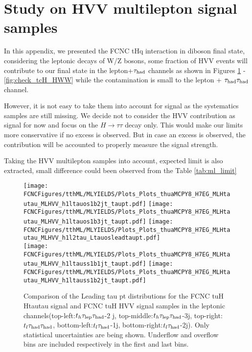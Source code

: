 \section{Study on HVV multilepton signal samples}
\label{sec:HVVML}

In this appendix, we presented the FCNC tHq interaction in diboson final state, considering the leptonic decays of W/Z bosons, some fraction of HVV events will contribute to our final state in the lepton+$\tau_\text{had}$ channels as shown in Figures \ref{fig:check_tuH_HWW} - \ref{fig:check_tcH_HWW} while the contamination is
small to the lepton + $\tau_\text{had}{}\tau_\text{had}$ channel.

However, it is not easy to take them into account for signal as the systematics samples are still missing. We decide not to consider the HVV contribution as signal for now
and focus on the $H\rightarrow \tau\tau$ decay only. This would make our limits more conservative if no excess is observed. But in case an excess is observed, the contribution will be accounted to properly measure the signal strength.

Taking the HVV multilepton samples into account, expected limit is also extracted, small difference could been observed from the Table \ref{tab:ml_limit}



\begin{figure}[htb]
  \centering
  \texttt{[image: \\FCNCFigures/tthML/MLYIELDS/Plots\_Plots\_thuaMCPY8\_H7EG\_MLHtautau\_MLHVV\_h1ltauos1b2jt\_taupt.pdf]}
  \texttt{[image: \\FCNCFigures/tthML/MLYIELDS/Plots\_Plots\_thuaMCPY8\_H7EG\_MLHtautau\_MLHVV\_h1ltauos1b3jt\_taupt.pdf]}
  \texttt{[image: \\FCNCFigures/tthML/MLYIELDS/Plots\_Plots\_thuaMCPY8\_H7EG\_MLHtautau\_MLHVV\_h1l2tau\_Ltauosleadtaupt.pdf]}
\\
\texttt{[image: \\FCNCFigures/tthML/MLYIELDS/Plots\_Plots\_thuaMCPY8\_H7EG\_MLHtautau\_MLHVV\_h1ltauss1b1jt\_taupt.pdf]}
\texttt{[image: \\FCNCFigures/tthML/MLYIELDS/Plots\_Plots\_thuaMCPY8\_H7EG\_MLHtautau\_MLHVV\_h1ltauss1b2jt\_taupt.pdf]}
\\
\caption{ Comparison of the Leading tau pt distributions for the FCNC tuH Htautau signal and FCNC tuH HVV signal samples in the leptonic channels(top-left:$t_h\tau_\text{lep}{}\tau_\text{had}$-2
j, top-middle:$t_h\tau_\text{lep}{}\tau_\text{had}$-3j, top-right:$t_l\tau_\text{had}{}\tau_\text{had}$, bottom-left:$t_l\tau_\text{had}$-1j, bottom-right:$t_l\tau_\text{had}$-2j). Only statistical uncertainties are being shown. Underflow and overflow bins are included respectively in the first and last bins.}
\label{fig:check_tuH_HWW}
\end{figure}


